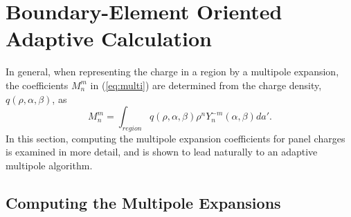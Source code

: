 \section{Boundary-Element Oriented Adaptive Calculation}
\label{adfamu}

In general, when representing the charge in a region by a
multipole expansion, the coefficients $M^m_n$ in (\ref{eq:multi})
are determined from the charge density, $ q( \rho, \alpha, \beta) $, as
\begin{equation}
M^m_n = \int_{region} 
q(\rho, \alpha, \beta) \rho^n Y^{-m}_n(\alpha , \beta) da'.
\label{eq:mulmom}
\end{equation}
In this section, computing the multipole expansion coefficients for
panel charges is examined in more detail, and is shown to lead
naturally to an adaptive multipole algorithm.

\subsection{Computing the Multipole Expansions}

